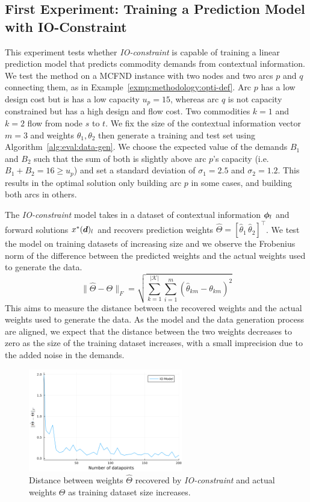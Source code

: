 \subsection{First Experiment: Training a Prediction Model with IO-Constraint} \label{sec:eval:io-constraint-first-experiment}

This experiment tests whether \textit{IO-constraint} is capable of training a linear prediction model that predicts commodity demands from contextual information. We test the method on a MCFND instance with two nodes and two arcs $p$ and $q$ connecting them, as in Example~\ref{exmp:methodology:opti-def}. Arc $p$ has a low design cost but is has a low capacity $u_p = 15$, whereas arc $q$ is not capacity constrained but has a high design and flow cost. Two commodities $k=1$ and $k=2$ flow from node $s$ to $t$. We fix the size of the contextual information vector $m = 3$ and weights $\theta_1, \theta_2$ then generate a training and test set using Algorithm~\ref{alg:eval:data-gen}. We choose the expected value of the demands $B_1$ and $B_2$ such that the sum of both is slightly above arc $p$'s capacity (i.e. $B_1 + B_2 = 16 \geq u_p$) and set a standard deviation of $\sigma_1 = 2.5$ and $\sigma_2 =1.2$. This results in the optimal solution only building arc $p$ in some cases, and building both arcs in others.

The \textit{IO-constraint} model takes in a dataset of contextual information ${\bm{\phi}}_l$ and forward solutions $x^*({\bm{d}})_l$ and recovers prediction weights $\hat{\Theta} = [\hat{\theta}_1\, \hat{\theta}_2]^\top$. We test the model on training datasets of increasing size and we observe the Frobenius norm of the difference between the predicted weights and the actual weights used to generate the data.
\begin{equation}
    \lVert \hat{\Theta} - \Theta \rVert_F = \sqrt{\sum_{k=1}^{|\mathcal{K}|} \sum_{i=1}^m (\hat{\theta}_{km} - \theta_{km})^2}
\end{equation}
This aims to measure the distance between the recovered weights and the actual weights used to generate the data. As the model and the data generation process are aligned, we expect that the distance between the two weights decreases to zero as the size of the training dataset increases, with a small imprecision due to the added noise in the demands.

\begin{figure}
    \centering
    \includegraphics[width=0.6\textwidth]{res/img/frobenius.png}
    \caption{Distance between weights $\hat{\Theta}$ recovered by \textit{IO-constraint} and actual weights $\Theta$ as training dataset size increases.}
    \label{fig:eval:frobenius}
\end{figure}

